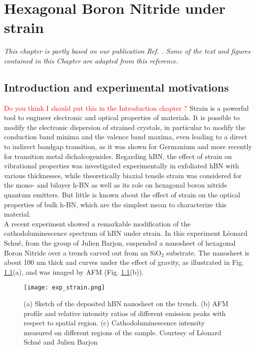 \chapter{Hexagonal Boron Nitride under strain}
\chaptertoc{}

\textit{This chapter is partly based on our publication Ref. \cite{lechifflart2022excitons}. Some of the text and figures contained in this Chapter are adapted from this reference.}

%
\section{Introduction and experimental motivations}
\textcolor{red}{Do you think I should put this in the Introduction chapter ?}
Strain is a powerful tool to engineer electronic and optical properties of materials. It is possible to modify the electronic dispersion of strained crystals, in particular to modify the conduction band minima and the valence band maxima, even leading to a direct to indirect bandgap transition, as it was shown for Germanium \cite{hoshina2009first,cheng2010strain} and more recently for transition metal dichalcogenides.\cite{desai2014strain,choudhary2020shear,frisenda2017biaxial} Regarding hBN, the effect of strain on vibrational properties was investigated experimentally in exfoliated hBN with various thicknesses,\cite{androulidakis2018strained} while theoretically biaxial tensile strain was considered for the mono- and bilayer h-BN \cite{yang2013distorted,fujimoto2016band} as well as its role on hexagonal boron nitride quantum emitters.\cite{tabesh2021strain} But little is known about the effect of strain on the optical properties of bulk h-BN, which are the simplest mean to characterize this material. \\
A recent experiment showed a remarkable modification of the cathodoluminescence spectrum of hBN under strain. \cite{schue2017proprietes} In this experiment Léonard Schué, from the group of Julien Barjon, suspended a nanosheet of hexagonal Boron Nitride over a trench carved out from an SiO$_2$ substrate. The nanosheet is about 100 nm thick and curves under the effect of gravity, as illustrated in Fig. \ref{fig:exp_strain}(a), and was imaged by \acrfull{AFM} (Fig. \ref{fig:exp_strain}(b)).
\begin{figure}[tbp]
	\vspace{0.2cm}
	\setcapindent{2em}
	\centering
	\texttt{[image: exp\_strain.png]}
	\caption{(a) Sketch of the deposited hBN nanosheet on the trench. (b) AFM profile and relative intensity ratios of different emission peaks with respect to spatial region. (c) Cathodoluminescence intensity measured on different regions of the sample. Courtesy of Léonard Schué and Julien Barjon}
	\label{fig:exp_strain}
\end{figure}
